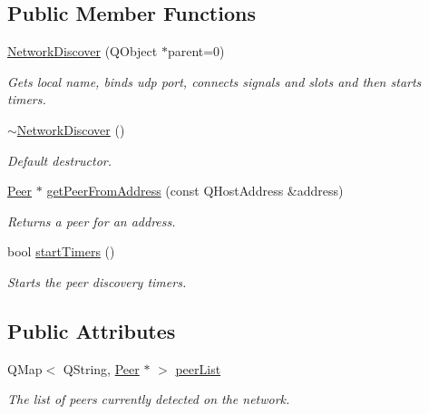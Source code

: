 \subsection*{\-Public \-Member \-Functions}
\begin{DoxyCompactItemize}
\item 
\hyperlink{class_network_discover_a35d97308463f9cbe622767b2d364bdbb}{\-Network\-Discover} (\-Q\-Object $\ast$parent=0)
\begin{DoxyCompactList}\small\item\em \-Gets local name, binds udp port, connects signals and slots and then starts timers. \end{DoxyCompactList}\item 
\hypertarget{class_network_discover_a416e23eb1f6925197596731e3c5f325e}{
\hyperlink{class_network_discover_a416e23eb1f6925197596731e3c5f325e}{$\sim$\-Network\-Discover} ()}
\label{class_network_discover_a416e23eb1f6925197596731e3c5f325e}

\begin{DoxyCompactList}\small\item\em \-Default destructor. \end{DoxyCompactList}\item 
\hyperlink{class_peer}{\-Peer} $\ast$ \hyperlink{class_network_discover_a91ec8539ddfeb90f6735d05f2f10b97a}{get\-Peer\-From\-Address} (const \-Q\-Host\-Address \&address)
\begin{DoxyCompactList}\small\item\em \-Returns a peer for an address. \end{DoxyCompactList}\item 
bool \hyperlink{class_network_discover_ac25855eb9d181d51c725a57f693d58f8}{start\-Timers} ()
\begin{DoxyCompactList}\small\item\em \-Starts the peer discovery timers. \end{DoxyCompactList}\end{DoxyCompactItemize}
\subsection*{\-Public \-Attributes}
\begin{DoxyCompactItemize}
\item 
\hypertarget{class_network_discover_ac7f0c8a7a8e780c83c24b4fa8cbbbfef}{
\-Q\-Map$<$ \-Q\-String, \hyperlink{class_peer}{\-Peer} $\ast$ $>$ \hyperlink{class_network_discover_ac7f0c8a7a8e780c83c24b4fa8cbbbfef}{peer\-List}}
\label{class_network_discover_ac7f0c8a7a8e780c83c24b4fa8cbbbfef}

\begin{DoxyCompactList}\small\item\em \-The list of peers currently detected on the network. \end{DoxyCompactList}\end{DoxyCompactItemize}


